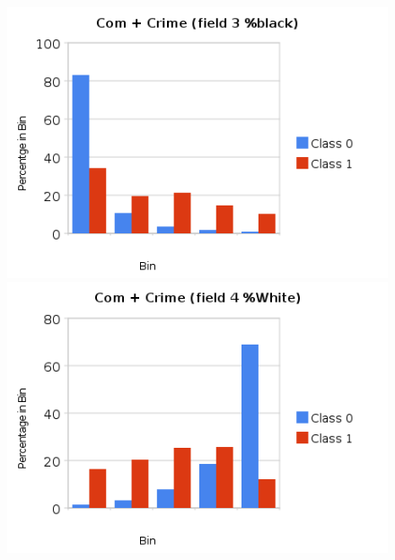 \documentclass[a4paper,10pt]{article}
\begin{document}
        \begin{figure}[ht!]
          \begin{minipage}[b]{0.5\linewidth}
            \includegraphics[scale=0.45]{charts/ComCrimePics/CC3.png}
          \end{minipage}
          \begin{minipage}[b]{0.5\linewidth}
             \includegraphics[scale=0.45]{charts/ComCrimePics/CC4.png}
          \end{minipage}
        \end{figure}
\end{document}
